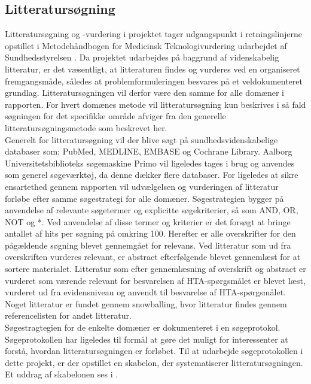 \subsection{Litteratursøgning} \label{litteratursogning}
Litteratursøgning og -vurdering i projektet tager udgangspunkt i retningslinjerne opstillet i Metodehåndbogen for Medicinsk Teknologivurdering udarbejdet af Sundhedsstyrelsen \citep{metodehaandbogen}. Da projektet udarbejdes på baggrund af videnskabelig litteratur, er det væsentligt, at litteraturen findes og vurderes ved en organiseret fremgangsmåde, således at problemformuleringen besvares på et veldokumenteret grundlag. Litteratursøgningen vil derfor være den samme for alle domæner i rapporten. For hvert domænes metode vil litteratursøgning kun beskrives i så fald søgningen for det specifikke område afviger fra den generelle litteratursøgningsmetode som beskrevet her. \\
Generelt for litteratursøgning vil der blive søgt på sundhedsvidenskabelige databaser som: PubMed, MEDLINE, EMBASE og Cochrane Library. Aalborg Universitetsbiblioteks søgemaskine Primo vil ligeledes tages i brug og anvendes som generel søgeværktøj, da denne dækker flere databaser. For ligeledes at sikre ensartethed gennem rapporten vil udvælgelsen og vurderingen af litteratur forløbe efter samme søgestrategi for alle domæner. Søgestrategien bygger på anvendelse af relevante søgetermer og explicitte søgekriterier, så som AND, OR, NOT og *. Ved anvendelse af disse termer og kriterier er det forsøgt at bringe antallet af hits per søgning på omkring 100. Herefter er alle overskrifter for den pågældende søgning blevet gennemgået for relevans. Ved litteratur som ud fra overskriften vurderes relevant, er abstract efterfølgende blevet gennemlæst for at sortere materialet. Litteratur som efter gennemlæsning af overskrift og abstract er vurderet som værende relevant for besvarelsen af HTA-spørgsmålet er blevet læst, vurderet ud fra evidensniveau og anvendt til besvarelse af HTA-spørgsmålet. Noget litteratur er fundet gennem snowballing, hvor litteratur findes gennem referencelisten for andet litteratur. \\ 
Søgestragtegien for de enkelte domæner er dokumenteret i en søgeprotokol. Søgeprotokollen har ligeledes til formål at gøre det muligt for interessenter at forstå, hvordan litteratursøgningen er forløbet. \citep{metodehaandbogen} Til at udarbejde søgeprotokollen i dette projekt, er der opstillet en skabelon, der systematiserer litteratursøgningen. Et uddrag af skabelonen ses i .

